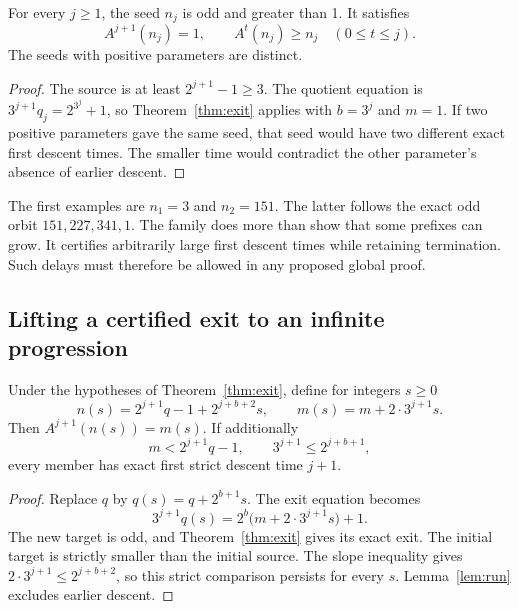 \begin{theorem}\label{thm:seeds}
For every $j\ge1$, the seed $n_j$ is odd and greater than 1. It satisfies
\begin{equation}\label{eq:seedresult}
A^{j+1}(n_j)=1,\qquad A^t(n_j)\ge n_j\quad(0\le t\le j).
\end{equation}
The seeds with positive parameters are distinct.
\end{theorem}
\begin{proof}
The source is at least $2^{j+1}-1\ge3$. The quotient equation is
$3^{j+1}q_j=2^{3^j}+1$, so Theorem~\ref{thm:exit} applies with $b=3^j$ and $m=1$. If two positive parameters gave the same seed, that seed would have two different exact first descent times. The smaller time would contradict the other parameter's absence of earlier descent.
\end{proof}

The first examples are $n_1=3$ and $n_2=151$. The latter follows the exact odd orbit $151,227,341,1$. The family does more than show that some prefixes can grow. It certifies arbitrarily large first descent times while retaining termination. Such delays must therefore be allowed in any proposed global proof.

\subsection{Lifting a certified exit to an infinite progression}
\begin{theorem}\label{thm:lift}
Under the hypotheses of Theorem~\ref{thm:exit}, define for integers $s\ge0$
\begin{equation}\label{eq:lift}
n(s)=2^{j+1}q-1+2^{j+b+2}s,\qquad
m(s)=m+2\cdot3^{j+1}s.
\end{equation}
Then $A^{j+1}(n(s))=m(s)$. If additionally
\begin{equation}\label{eq:slopes}
m<2^{j+1}q-1,\qquad 3^{j+1}\le2^{j+b+1},
\end{equation}
every member has exact first strict descent time $j+1$.
\end{theorem}
\begin{proof}
Replace $q$ by $q(s)=q+2^{b+1}s$. The exit equation becomes
\[
3^{j+1}q(s)=2^b\bigl(m+2\cdot3^{j+1}s\bigr)+1.
\]
The new target is odd, and Theorem~\ref{thm:exit} gives its exact exit. The initial target is strictly smaller than the initial source. The slope inequality gives $2\cdot3^{j+1}\le2^{j+b+2}$, so this strict comparison persists for every $s$. Lemma~\ref{lem:run} excludes earlier descent.
\end{proof}

